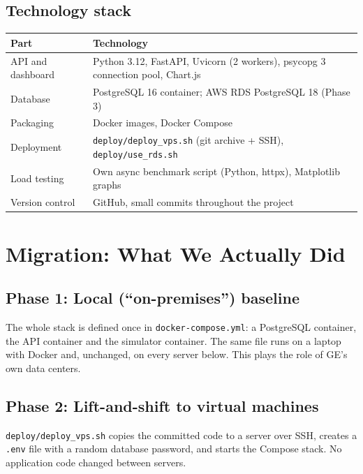\documentclass[12pt,a4paper]{article}
\begin{document}
\subsection{Technology stack}
\begin{center}
\begin{tabularx}{\linewidth}{@{}p{4cm}L@{}}
\toprule
\textbf{Part} & \textbf{Technology} \\
\midrule
API and dashboard & Python 3.12, FastAPI, Uvicorn (2 workers), psycopg 3 connection pool, Chart.js \\
Database & PostgreSQL 16 container; AWS RDS PostgreSQL 18 (Phase 3) \\
Packaging & Docker images, Docker Compose \\
Deployment & \texttt{deploy/deploy\_vps.sh} (git archive + SSH), \texttt{deploy/use\_rds.sh} \\
Load testing & Own async benchmark script (Python, httpx), Matplotlib graphs \\
Version control & GitHub, small commits throughout the project \\
\bottomrule
\end{tabularx}
\end{center}

\section{Migration: What We Actually Did}
\subsection{Phase 1: Local (``on-premises'') baseline}
The whole stack is defined once in \texttt{docker-compose.yml}: a PostgreSQL container, the API container
and the simulator container. The same file runs on a laptop with Docker and, unchanged, on every
server below. This plays the role of GE's own data centers.

\subsection{Phase 2: Lift-and-shift to virtual machines}
\texttt{deploy/deploy\_vps.sh} copies the committed code to a server over SSH, creates a \texttt{.env} file with
a random database password, and starts the Compose stack. No application code changed between servers.
\end{document}
